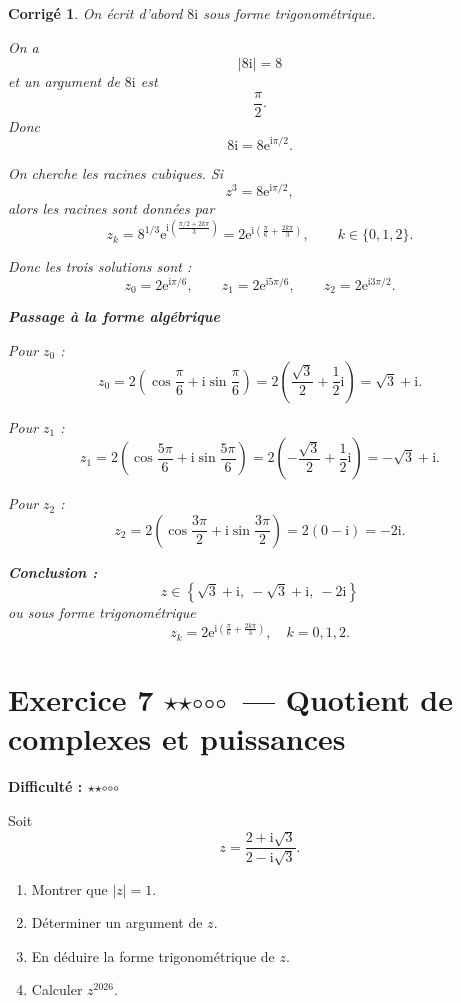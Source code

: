 \documentclass[11pt,a4paper]{article}
\newtheorem*{corrige}{Corrigé}
\newcommand{\ii}{\mathrm{i}}
\newcommand{\e}{\mathrm{e}}
\newcommand{\fullstar}{\(\star\)}
\newcommand{\emptystar}{\(\circ\)}
\newcommand{\twoStars}{\fullstar\fullstar\emptystar\emptystar\emptystar}
\newcommand{\difficulty}[1]{\textbf{Difficulté : #1}}
\begin{document}
\begin{corrige}
On écrit d'abord \(8\ii\) sous forme trigonométrique.

On a
\[
|8\ii|=8
\]
et un argument de \(8\ii\) est
\[
\frac{\pi}{2}.
\]
Donc
\[
8\ii=8\e^{\ii\pi/2}.
\]

On cherche les racines cubiques. Si
\[
z^3=8\e^{\ii\pi/2},
\]
alors les racines sont données par
\[
z_k=8^{1/3}\e^{\ii\left(\frac{\pi/2+2k\pi}{3}\right)}
=2\e^{\ii\left(\frac{\pi}{6}+\frac{2k\pi}{3}\right)},
\qquad k\in\{0,1,2\}.
\]

Donc les trois solutions sont :
\[
z_0=2\e^{\ii\pi/6},\qquad
z_1=2\e^{\ii5\pi/6},\qquad
z_2=2\e^{\ii3\pi/2}.
\]

\textbf{Passage à la forme algébrique}

Pour \(z_0\) :
\[
z_0=2\left(\cos\frac{\pi}{6}+\ii\sin\frac{\pi}{6}\right)
=2\left(\frac{\sqrt3}{2}+\frac12\ii\right)=\sqrt3+\ii.
\]

Pour \(z_1\) :
\[
z_1=2\left(\cos\frac{5\pi}{6}+\ii\sin\frac{5\pi}{6}\right)
=2\left(-\frac{\sqrt3}{2}+\frac12\ii\right)=-\sqrt3+\ii.
\]

Pour \(z_2\) :
\[
z_2=2\left(\cos\frac{3\pi}{2}+\ii\sin\frac{3\pi}{2}\right)=2(0-\ii)=-2\ii.
\]

\textbf{Conclusion :}
\[
\boxed{z\in\left\{\sqrt3+\ii,\ -\sqrt3+\ii,\ -2\ii\right\}}
\]
ou sous forme trigonométrique
\[
\boxed{z_k=2\e^{\ii\left(\frac{\pi}{6}+\frac{2k\pi}{3}\right)},\quad k=0,1,2.}
\]
\end{corrige}

\section{Exercice 7 \twoStars\ --- Quotient de complexes et puissances}
\difficulty{\twoStars}

Soit
\[
z=\frac{2+\ii\sqrt3}{2-\ii\sqrt3}.
\]

\begin{enumerate}
    \item Montrer que \(|z|=1\).
    \item Déterminer un argument de \(z\).
    \item En déduire la forme trigonométrique de \(z\).
    \item Calculer \(z^{2026}\).
\end{enumerate}
\end{document}
